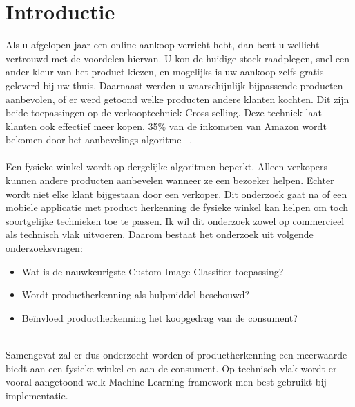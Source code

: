 
\section{Introductie} %
\label{sec:introductie}

Als u afgelopen jaar een online aankoop verricht hebt, dan bent u wellicht vertrouwd met de voordelen hiervan. U kon de huidige stock raadplegen, snel een ander kleur van het product kiezen, en mogelijks is uw aankoop zelfs gratis geleverd bij uw thuis. Daarnaast werden u waarschijnlijk bijpassende producten aanbevolen, of er werd getoond welke producten andere klanten kochten. Dit zijn beide toepassingen op de verkooptechniek Cross-selling. 
Deze techniek laat klanten ook effectief meer kopen, 35\% van de inkomsten van Amazon wordt bekomen door het aanbevelings-algoritme ~\autocite{Amazon}. \\~\\
Een fysieke winkel wordt op dergelijke algoritmen beperkt. Alleen verkopers kunnen andere producten aanbevelen wanneer ze een bezoeker helpen. Echter wordt niet elke klant bijgestaan door een verkoper. Dit onderzoek gaat na of een mobiele applicatie met product herkenning de fysieke winkel kan helpen om toch soortgelijke technieken toe te passen. Ik wil dit onderzoek zowel op commercieel als technisch vlak uitvoeren. Daarom bestaat het onderzoek uit volgende onderzoeksvragen:  
\begin{itemize}
  \item Wat is de nauwkeurigste Custom Image Classifier toepassing?
  \item Wordt productherkenning als hulpmiddel beschouwd?
  \item Beïnvloed productherkenning het koopgedrag van de consument?
\end{itemize}
\  \\
Samengevat zal er dus onderzocht worden of productherkenning een meerwaarde biedt aan een fysieke winkel en aan de consument. Op technisch vlak wordt er vooral aangetoond welk Machine Learning framework men best gebruikt bij implementatie. 


